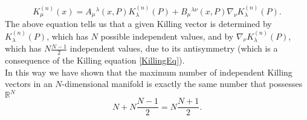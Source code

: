 \begin{equation}\label{KillingExp}
    K_\mu^{(n)}(x)=A_\mu\phantom{}^\lambda(x,P)K_\lambda^{(n)}(P)+B_\mu\phantom{}^{\lambda\nu}(x,P)\nabla_\nu K_\lambda^{(n)}(P).
\end{equation}
The above equation tells us that a given Killing vector is determined by $K_\lambda^{(n)}(P)$, which has $N$ possible independent values, and by $\nabla_\nu K_\lambda^{(n)}(P)$, which has $N\frac{N-1}{2}$ independent values, due to its antisymmetry (which is a consequence of the Killing equation \eqref{KillingEq}).\\
In this way we have shown that the maximum number of independent Killing vectors in an $N$-dimensional manifold is exactly the same number that possesses $\mathbb{R}^N$ $$N+N\frac{N-1}{2}=N\frac{N+1}{2}.$$

